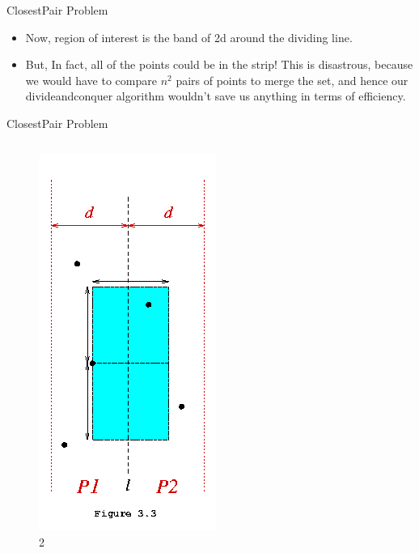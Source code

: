 \documentclass{beamer}
\begin{document}
\begin{frame}[<+->]{ClosestPair Problem}
  \begin{itemize}
  \item Now, region of interest is the band of 2d around the dividing line.
  \item \alert{But, In fact, all of the points could be in the strip! This is disastrous, because we would have to compare $n^2$ pairs of points to merge the set, and hence our divide\-and\-conquer algorithm wouldn't save us anything in terms of efficiency.}
  \end{itemize}
\end{frame}

\begin{frame}{ClosestPair Problem}
  \begin{columns}[t]
    \begin{column}{0.3\textwidth}
      \vspace{10mm}
      \begin{figure}
	\includegraphics[scale=0.30]{figure22.png}
	\caption{2}
      \end{figure}
    \end{column}
    \begin{column}{0.7\textwidth}
\end{column}
\end{columns}
\end{frame}
\end{document}
